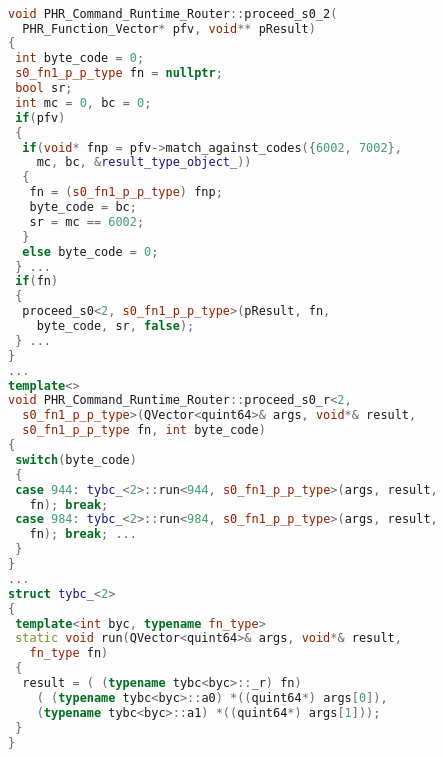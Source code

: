 \begin{lstlisting}[caption={Identifying Function 
 Equivalence Classes},
language = C++, numbers = none, label={lst:figPVMrt},
    basicstyle = \ttfamily\bfseries\tiny, linewidth = .95\linewidth] 

void PHR_Command_Runtime_Router::proceed_s0_2(
  PHR_Function_Vector* pfv, void** pResult)
{
 int byte_code = 0;
 s0_fn1_p_p_type fn = nullptr;
 bool sr;
 int mc = 0, bc = 0;
 if(pfv)
 {
  if(void* fnp = pfv->match_against_codes({6002, 7002}, 
    mc, bc, &result_type_object_))
  {
   fn = (s0_fn1_p_p_type) fnp;
   byte_code = bc;
   sr = mc == 6002;
  }
  else byte_code = 0;
 } ... 
 if(fn)
 {
  proceed_s0<2, s0_fn1_p_p_type>(pResult, fn, 
    byte_code, sr, false);
 } ...
}
...
template<>
void PHR_Command_Runtime_Router::proceed_s0_r<2, 
  s0_fn1_p_p_type>(QVector<quint64>& args, void*& result,
  s0_fn1_p_p_type fn, int byte_code)
{
 switch(byte_code)
 {
 case 944: tybc_<2>::run<944, s0_fn1_p_p_type>(args, result, 
   fn); break;
 case 984: tybc_<2>::run<984, s0_fn1_p_p_type>(args, result, 
   fn); break; ...
 }
}
...
struct tybc_<2>
{
 template<int byc, typename fn_type>
 static void run(QVector<quint64>& args, void*& result,
   fn_type fn)
 {
  result = ( (typename tybc<byc>::_r) fn)
    ( (typename tybc<byc>::a0) *((quint64*) args[0]),  
    (typename tybc<byc>::a1) *((quint64*) args[1]));
 }
}
\end{lstlisting}
